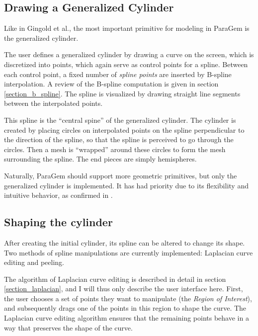 \documentclass[english]{article}
\begin{document}
\subsection{Drawing a Generalized Cylinder}

Like in Gingold et al., the most important primitive for modeling in ParaGem is the generalized cylinder. 

The user defines a generalized cylinder by drawing a curve on the screen, which is discretized into points, which again serve as control points for a spline. Between each control point, a fixed number of \textit{spline points} are inserted by B-spline interpolation. A review of the B-spline computation is given in section \ref{section_b_spline}. The spline is visualized by drawing straight line segments between the interpolated points.

This spline is the ``central spine'' of the generalized cylinder. The cylinder is created by placing circles on interpolated points on the spline perpendicular to the direction of the spline, so that the spline is perceived to go through the circles. Then a mesh is ``wrapped'' around these circles to form the mesh surrounding the spline. The end pieces are simply hemispheres.

Naturally, ParaGem should support more geometric primitives, but only the generalized cylinder is implemented. It has had priority due to its flexibility and intuitive behavior, as confirmed in \cite{gingold09}.

\subsection{Shaping the cylinder}


After creating the initial cylinder, its spline can be altered to change its shape. Two methods of spline manipulations are currently implemented: Laplacian curve editing and peeling.

The algorithm of Laplacian curve editing is described in detail in section \ref{section_laplacian}, and I will thus only describe the user interface here. First, the user chooses a set of points they want to manipulate (the \textit{Region of Interest}), and subsequently drags one of the points in this region to shape the curve. The Laplacian curve editing algorithm ensures that the remaining points behave in a way that preserves the shape of the curve.
\end{document}

